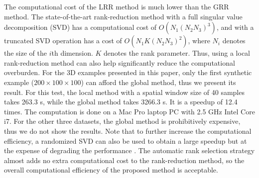 
The computational cost of the LRR method is much lower than the GRR method. The state-of-the-art rank-reduction method with a full singular value decomposition (SVD) has a computational cost of $O(N_1(N_2N_3)^3)$, and with a truncated SVD operation has a cost of $O(N_1K(N_2N_3)^2)$, where $N_i$ denotes the size of the $i$th dimension. $K$ denotes the rank parameter.
Thus, using a local rank-reduction method can also help significantly reduce the computational overburden. For the 3D examples presented in this paper, only the first synthetic example ($200\times 100\times 100$) can afford the global method, thus we present its result. For this test, the local method with a spatial window size of 40 samples takes 263.3 s, while the global method takes 3266.3 s. It is a speedup of 12.4 times. The computation is done on a Mac Pro laptop PC with 2.5 GHz Intel Core i7. For the other three datasets, the global method is prohibitively expensive, thus we do not show the results. Note that to further increase the computational efficiency, a randomized SVD can also be used to obtain a large speedup but at the expense of degrading the performance \cite[]{li2014large}. The automatic rank selection strategy almost adds no extra computational cost to the rank-reduction method, so the overall computational efficiency of the proposed method is acceptable. 

